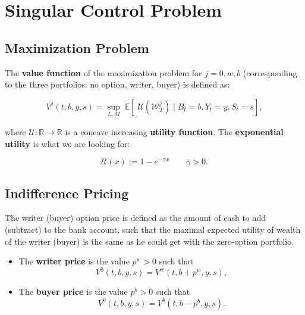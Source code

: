 \documentclass[12pt]{article}
\begin{document}
\section{Singular Control Problem}
\label{sec:singular-control-problem}

\subsection{Maximization Problem}
\label{sec:maximization-problem}

The \textbf{value function} of the maximization problem for $j=0,w,b$ (corresponding to the three portfolios: no option, writer, buyer) is defined as:

\begin{equation}
V^j(t,b,y,s) = \sup_{L,M} \;  \mathbb{E}\left[ \; \mathcal{U}\left( \mathcal{W}^{j}_T \right) \; \bigg| \; B_{t} = b, Y_{t} = y, S_{t} = s \right],
\end{equation}

where $\mathcal{U}: \mathbb{R} \to \mathbb{R}$ is a concave increasing \textbf{utility function}. The \textbf{exponential utility} is what we are looking for:

\begin{equation}
\mathcal{U}(x) := 1 - e^{-\gamma x} \quad \quad \gamma > 0.
\end{equation}

\subsection{Indifference Pricing}
\label{sec:indifference-pricing}

The writer (buyer) option price is defined as the amount of cash to add (subtract) to the bank account, 
such that the maximal expected utility of wealth of the writer (buyer) is the same as he could get with 
the zero-option portfolio.

\begin{itemize}
    \item The \textbf{writer price} is the value $p^w > 0$ such that 
    \begin{equation}
        V^0(t,b,y,s) = V^w(t,b+p^w,y,s),
    \end{equation}
    
    \item The \textbf{buyer price} is the value $p^b > 0$ such that
    \begin{equation}
        V^0(t,b,y,s) = V^b(t,b-p^b,y,s).
    \end{equation}
\end{itemize}

\end{document}
